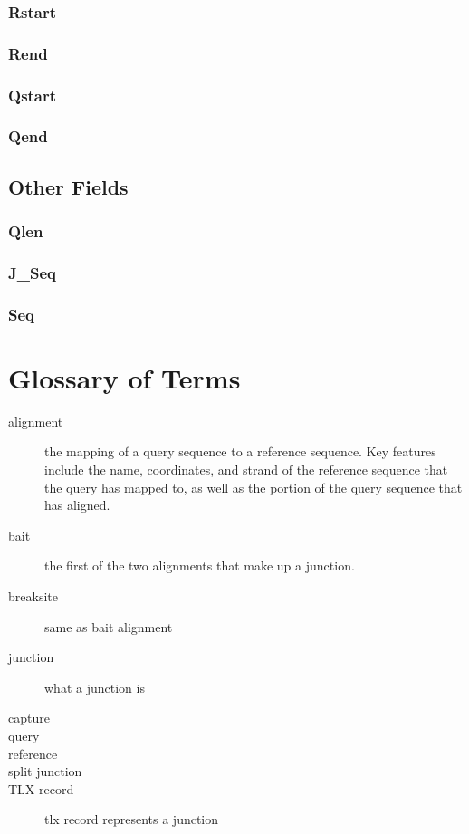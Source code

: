 \documentclass{article}
\begin{document}
\subsubsection*{Rstart}
\subsubsection*{Rend}
\subsubsection*{Qstart}
\subsubsection*{Qend}


\subsection{Other Fields}
\subsubsection*{Qlen}
\subsubsection*{J\_Seq}
\subsubsection*{Seq}


\section{Glossary of Terms}

\begin{description}

  \item[alignment] the mapping of a query sequence to a reference sequence. Key features include the name, coordinates, and strand of the reference sequence that the query has mapped to, as well as the portion of the query sequence that has aligned.
  \item[bait] the first of the two alignments that make up a junction.
  \item[breaksite] same as bait alignment
  \item[junction] what a junction is
  \item[capture]
  \item[query]
  \item[reference]
  \item[split junction]
  \item[TLX record] tlx record represents a junction

\end{description}
\end{document}
